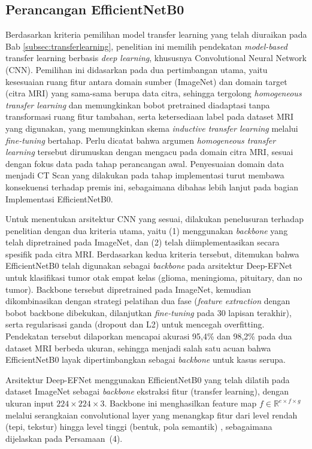 \subsection{Perancangan EfficientNetB0}
Berdasarkan kriteria pemilihan model transfer learning yang telah diuraikan pada Bab \ref{subsec:transferlearning}, penelitian ini memilih pendekatan \textit{model-based} transfer learning berbasis \textit{deep learning}, khususnya Convolutional Neural Network (CNN). Pemilihan ini didasarkan pada dua pertimbangan utama, yaitu kesesuaian ruang fitur antara domain sumber (ImageNet) dan domain target (citra MRI) yang sama-sama berupa data citra, sehingga tergolong \textit{homogeneous transfer learning} dan memungkinkan bobot pretrained diadaptasi tanpa transformasi ruang fitur tambahan, serta ketersediaan label pada dataset MRI yang digunakan, yang memungkinkan skema \textit{inductive transfer learning} melalui \textit{fine-tuning} bertahap. Perlu dicatat bahwa argumen \textit{homogeneous transfer learning} tersebut dirumuskan dengan mengacu pada domain citra MRI, sesuai dengan fokus data pada tahap perancangan awal. Penyesuaian domain data menjadi CT Scan yang dilakukan pada tahap implementasi turut membawa konsekuensi terhadap premis ini, sebagaimana dibahas lebih lanjut pada bagian Implementasi EfficientNetB0.

Untuk menentukan arsitektur CNN yang sesuai, dilakukan penelusuran terhadap penelitian dengan dua kriteria utama, yaitu (1) menggunakan \textit{backbone} yang telah dipretrained pada ImageNet, dan (2) telah diimplementasikan secara spesifik pada citra MRI. Berdasarkan kedua kriteria tersebut, ditemukan bahwa EfficientNetB0 telah digunakan sebagai \textit{backbone} pada arsitektur Deep-EFNet \cite{alshaari2025deepefnet} untuk klasifikasi tumor otak empat kelas (glioma, meningioma, pituitary, dan no tumor). Backbone tersebut dipretrained pada ImageNet, kemudian dikombinasikan dengan strategi pelatihan dua fase (\textit{feature extraction} dengan bobot backbone dibekukan, dilanjutkan \textit{fine-tuning} pada 30 lapisan terakhir), serta regularisasi ganda (dropout dan L2) untuk mencegah overfitting. Pendekatan tersebut dilaporkan mencapai akurasi 95,4\% dan 98,2\% pada dua dataset MRI berbeda ukuran, sehingga menjadi salah satu acuan bahwa EfficientNetB0 layak dipertimbangkan sebagai \textit{backbone} untuk kasus serupa.

Arsitektur Deep-EFNet menggunakan EfficientNetB0 yang telah dilatih pada dataset ImageNet sebagai \textit{backbone} ekstraksi fitur (transfer learning), dengan ukuran input $224 \times 224 \times 3$. Backbone ini menghasilkan feature map $f \in \mathbb{R}^{e \times f \times g}$ melalui serangkaian convolutional layer yang menangkap fitur dari level rendah (tepi, tekstur) hingga level tinggi (bentuk, pola semantik) \cite{alshaari2025deepefnet}, sebagaimana dijelaskan pada Persamaan~(4).


